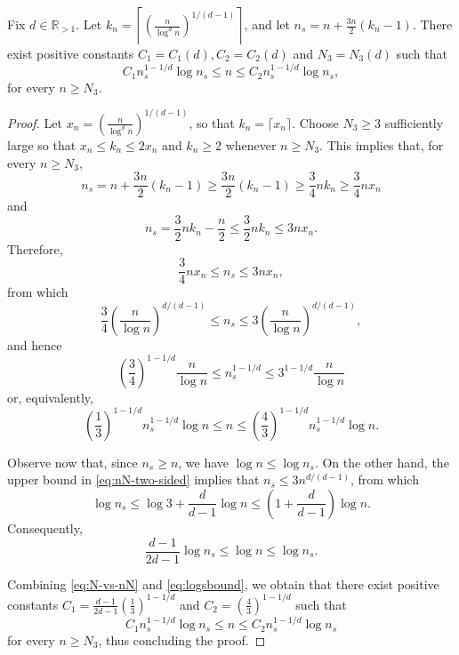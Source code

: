 \documentclass[10pt,a4paper]{amsart}
\begin{document}
\begin{lemma}
\label{expander-subdiv-order}
Fix $d\in\mathbb{R}_{>1}$. Let $k_n = \left\lceil\left(\frac{n}{\log^d n}\right)^{1/(d-1)}\right\rceil$, and let $n_s = n+\frac{3n}{2}(k_n-1)$. There exist positive constants $C_1 = C_1(d),C_2 = C_2(d)$ and $N_3=N_3(d)$ such
that
\[
C_1n_s^{1-1/d}\log n_s \leq n \leq C_2n_s^{1-1/d}\log n_s,
\]
for every $n\geq N_3$.
\end{lemma}

\begin{proof} Let $x_n = \left(\frac{n}{\log^d n}\right)^{1/(d-1)}$, so that $k_n=\lceil x_n\rceil$. Choose $N_3 \geq 3$ sufficiently large so that $x_n\leq k_n\leq 2x_n$ and $k_n\geq 2$ whenever $n \geq N_3$. This implies that, for every $n \geq N_3$, 
\[
n_s = n+\frac{3n}{2}(k_n-1) \geq \frac{3n}{2}(k_n-1) \geq \frac{3}{4}nk_n \geq \frac{3}{4}nx_n
\]
and
\[
n_s = \frac{3}{2}nk_n-\frac{n}{2} \leq \frac{3}{2}nk_n \leq 3nx_n.
\]
Therefore,
\[
\frac{3}{4}nx_n \leq n_s \leq 3nx_n,
\]
from which 
\begin{equation}
\label{eq:nN-two-sided}
\frac{3}{4}\left(\frac{n}{\log n}\right)^{d/(d-1)} \leq n_s \leq 3\left(\frac{n}{\log n}\right)^{d/(d-1)},
\end{equation}
and hence 
\[
\left(\frac{3}{4}\right)^{1-1/d}\frac{n}{\log n} \leq n_s^{1-1/d} \leq 3^{1-1/d}\frac{n}{\log n}
\]
or, equivalently,
\begin{equation}
\label{eq:N-vs-nN}
\left(\frac{1}{3}\right)^{1-1/d}n_s^{1-1/d}\log n \leq n \leq \left(\frac{4}{3}\right)^{1-1/d}n_s^{1-1/d}\log n.
\end{equation}

Observe now that, since $n_s\geq n$, we have $\log n\leq \log n_s$. On the other hand, the upper bound in \eqref{eq:nN-two-sided} implies that $n_s \leq 3n^{d/(d-1)}$, from which
\[
\log n_s \leq \log 3+\frac{d}{d-1}\log n \leq \left(1+\frac{d}{d-1}\right)\log n.
\]
Consequently,
\begin{equation}
\label{eq:logsbound}
\frac{d-1}{2d-1}\log n_s \leq \log n \leq \log n_s.
\end{equation}

Combining \eqref{eq:N-vs-nN} and \eqref{eq:logsbound}, we obtain that there exist positive constants $C_1 = \frac{d-1}{2d-1}\left(\frac{1}{3}\right)^{1-1/d}$ and $C_2 = \left(\frac{4}{3}\right)^{1-1/d}$ such that
\[
C_1n_s^{1-1/d}\log n_s \leq n \leq C_2n_s^{1-1/d}\log n_s
\]
for every $n \geq N_3$, thus concluding the proof.
\end{proof}
\end{document}
